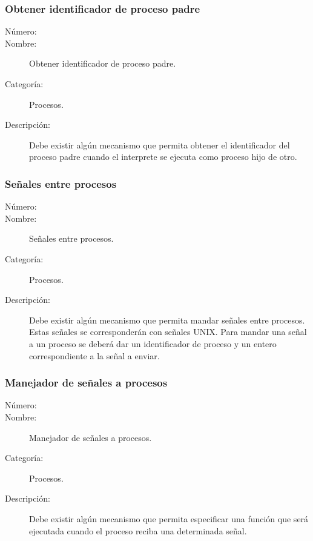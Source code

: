 \subsubsection{Obtener identificador de proceso padre}
\begin{framed}
	\begin{description}
		\item [Número:] \cn
		\item [Nombre:] Obtener identificador de proceso padre.
		\item [Categoría:] Procesos.
		\item [Descripción:] Debe existir algún mecanismo que permita obtener el identificador del proceso padre cuando 
		el interprete se ejecuta como proceso hijo de otro.
	\end{description}
\end{framed}

\subsubsection{Señales entre procesos}
\begin{framed}
	\begin{description}
		\item [Número:] \cn
		\item [Nombre:] Señales entre procesos.
		\item [Categoría:] Procesos.
		\item [Descripción:] Debe existir algún mecanismo que permita mandar señales entre procesos. Estas señales se corresponderán con
      señales UNIX. Para mandar una señal a un proceso se deberá dar un identificador de proceso y un entero correspondiente a la
      señal a enviar.
	\end{description}
\end{framed}

\subsubsection{Manejador de señales a procesos}
\begin{framed}
	\begin{description}
		\item [Número:] \cn
		\item [Nombre:] Manejador de señales a procesos.
		\item [Categoría:] Procesos.
		\item [Descripción:] Debe existir algún mecanismo que permita especificar una función que será ejecutada cuando el proceso reciba una 
      determinada señal.
	\end{description}
\end{framed}

